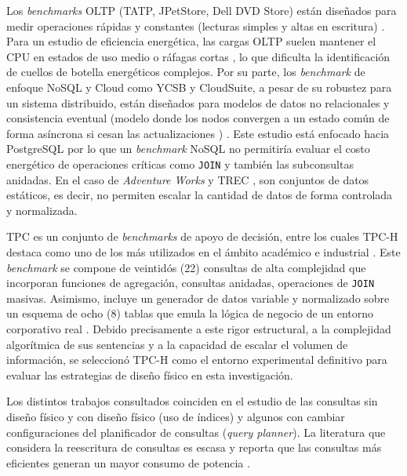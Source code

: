 \documentclass[12pt, letter paper]{report}
\begin{document}
        Los \textit{benchmarks} OLTP (TATP, JPetStore, Dell DVD Store) están
        diseñados para medir operaciones rápidas y constantes (lecturas simples
        y altas en escritura) \cite{gray1992transaction, difallah2013oltp}. Para
        un estudio de eficiencia energética, las cargas OLTP suelen mantener el
        CPU en estados de uso medio o ráfagas cortas \cite{wood1999dbmss}, lo
        que dificulta la identificación de cuellos de botella energéticos
        complejos. Por su parte, los \textit{benchmark} de enfoque
        NoSQL y Cloud como YCSB y CloudSuite, a pesar de su robustez para un
        sistema distribuido, están diseñados para modelos de datos no
        relacionales y consistencia eventual (modelo donde los nodos convergen a
        un estado común de forma asíncrona si cesan las actualizaciones
        \cite{vogels2009eventually}) \cite{Cooper2010YCSB,
        ferdman2022cloudsuite}. Este estudio está enfocado hacia PostgreSQL por
        lo que un \textit{benchmark} NoSQL no permitiría evaluar el costo
        energético de operaciones críticas como \texttt{JOIN} y también las
        subconsultas anidadas. En el caso de \textit{Adventure Works}
        \cite{Microsoft2023AdventureWorks} y TREC \cite{Voorhees2001Cranfield}, 
        son conjuntos de datos estáticos, es decir, no permiten escalar la
        cantidad de datos de forma controlada y normalizada.

        TPC es un conjunto de \textit{benchmarks} de apoyo de decisión, entre
        los cuales TPC-H destaca como uno de los más utilizados en el ámbito
        académico e industrial
        \cite{transactionprocessingperformancecounciltpctpc2022}. Este
        \textit{benchmark} se compone de veintidós (22) consultas de alta
        complejidad que incorporan funciones de agregación, consultas anidadas,
        operaciones de \texttt{JOIN} masivas. Asimismo, incluye un generador de
        datos variable y normalizado sobre un esquema de ocho (8) tablas que
        emula la lógica de negocio de un entorno corporativo real
        \cite{transactionprocessingperformancecounciltpctpc2022}. Debido
        precisamente a este rigor estructural, a la complejidad algorítmica de
        sus sentencias y a la capacidad de escalar el volumen de información, se
        seleccionó TPC-H como el entorno experimental definitivo para evaluar
        las estrategias de diseño físico en esta investigación.

        Los distintos trabajos consultados coinciden en el estudio de las
        consultas sin diseño físico y con diseño físico (uso de índices) y
        algunos con cambiar configuraciones del planificador de consultas
        (\textit{query planner}). La literatura que considera la reescritura de
        consultas es escasa y reporta que las consultas más eficientes generan
        un mayor consumo de potencia \cite{guoenergy-efficient2023,
        bunseexploring2009, hopfnertowards2009, bingleiguosql2015}.
\end{document}
